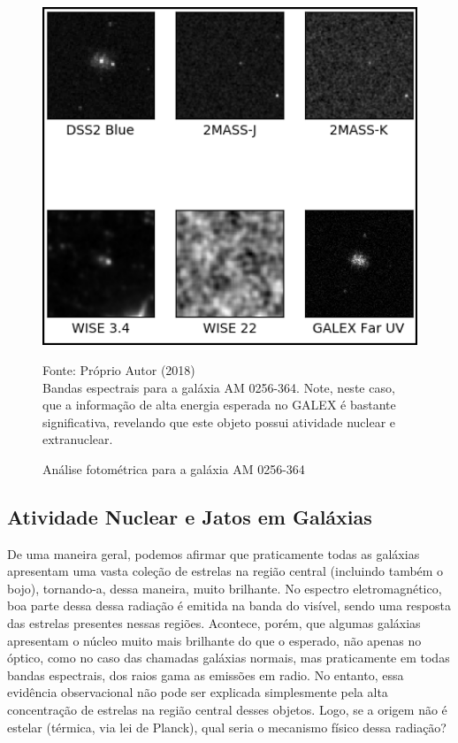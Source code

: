 \begin{figure}[H]
	\centering	
    \caption{Análise fotométrica para a galáxia AM 0256-364}
    \includegraphics[width=1.0\textwidth]{figuras/am0256-354.png}
   	\begin{center}
        \normalsize Fonte: Próprio Autor (2018)\\Bandas espectrais para a galáxia AM 0256-364. Note, neste caso, que a informação de alta energia esperada no GALEX é bastante significativa, revelando que este objeto possui atividade nuclear e extranuclear.
    \end{center}
	\label{fig:sbmt-moses}
\end{figure}

\subsection{Atividade Nuclear e Jatos em Galáxias}

De uma maneira geral, podemos afirmar que praticamente todas as galáxias apresentam uma vasta coleção de estrelas na região central (incluindo também o bojo), tornando-a, dessa maneira, muito brilhante. No espectro eletromagnético, boa parte dessa dessa radiação é emitida na banda do visível, sendo uma resposta das estrelas presentes nessas regiões. Acontece, porém, que algumas galáxias apresentam o núcleo muito mais brilhante do que o esperado, não apenas no óptico, como no caso das chamadas galáxias normais,  
mas praticamente em todas bandas espectrais, dos raios gama as emissões em radio. No entanto, essa evidência observacional não pode ser explicada simplesmente pela alta concentração de estrelas na região central desses objetos. Logo, se a origem não é estelar (térmica, via lei de Planck), qual seria o mecanismo físico dessa radiação?

